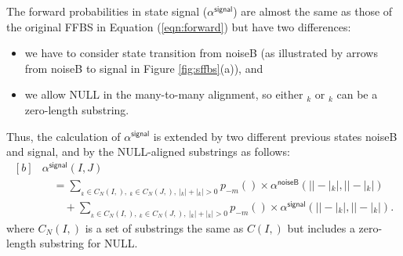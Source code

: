 \documentclass[english]{jnlp_1.4}
\def\subpair#1#2{}
\newcommand{\svec}[1]{}
\begin{document}
The forward probabilities in state {\sf signal} ({$\alpha^\mathsf{signal}$}) are almost the same as those of the original FFBS in Equation ({\ref{eqn:forward}}) but have two differences:
\begin{itemize}
\item we have to consider state transition from {\sf noiseB} (as illustrated by arrows from {\sf noiseB} to {\sf signal} in Figure {\ref{fig:sffbs}}(a)), and
\item we allow NULL in the many-to-many alignment, so either {$\svec{\sigma}_{k}$} or {$\svec{\tau}_{k}$} can be a zero-length substring.
\end{itemize}
Thus, the calculation of {$\alpha^\mathsf{signal}$} is extended by two different previous states {\sf noiseB} and {\sf signal},
and by the NULL-aligned substrings as follows:
\begin{equation}
\begin{aligned}[b]
 & \alpha^\mathsf{signal} (I, J) \\
 & \quad = \sum_{\svec{\sigma}_{k} \in C_{N}(I,\svec{s}),\ \svec{\tau}_{k} \in C_{N}(J,\svec{t}),\ |\svec{\sigma}_{k}|+|\svec{\tau}_{k}|>0} 
	p_{-m} (\subpair{\svec{\sigma}_{k}}{\svec{\tau}_{k}}) 
	\times \alpha^\mathsf{noiseB} (|\svec{s}| - |\svec{\sigma}_{k}|, |\svec{t}| - |\svec{\tau}_{k}|) \\ 
  & \qquad  +  \sum_{\svec{\sigma}_{k} \in C_{N}(I,\svec{s}),\ \svec{\tau}_{k} \in C_{N}(J,\svec{t}),\ |\svec{\sigma}_{k}|+|\svec{\tau}_{k}|>0} 
	p_{-m} (\subpair{\svec{\sigma}_{k}}{\svec{\tau}_{k}}) 
	\times \alpha^\mathsf{signal} (|\svec{s}| - |\svec{\sigma}_{k}|, |\svec{t}| - |\svec{\tau}_{k}|). 
\end{aligned}
\label{eqn:forward_signal}
\end{equation}
where {$C_{N}(I,\svec{s})$} is a set of substrings the same as {$C(I,\svec{s})$} but includes a zero-length substring for NULL.
\end{document}
